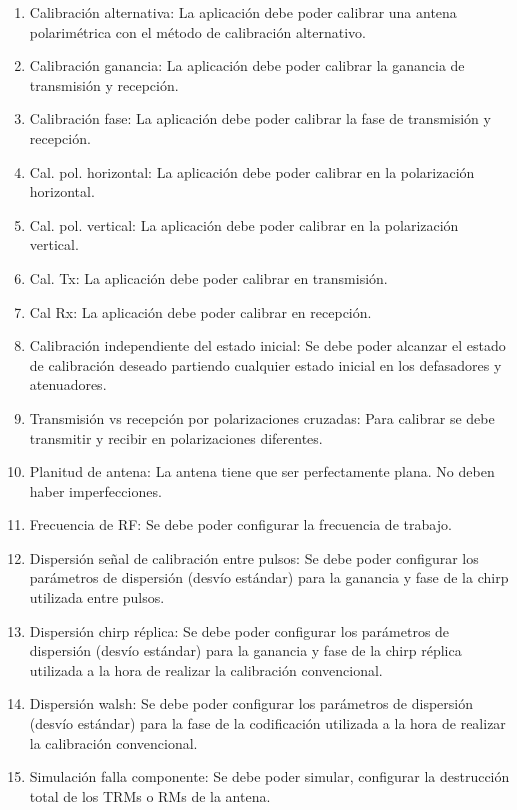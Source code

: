 \begin{enumerate}
    \item Calibración alternativa: La aplicación debe poder calibrar una antena polarimétrica con el método de calibración alternativo.

    \item Calibración ganancia: La aplicación debe poder calibrar la ganancia de transmisión y recepción.

    \item Calibración fase: La aplicación debe poder calibrar la fase de transmisión y recepción.

    \item Cal. pol. horizontal: La aplicación debe poder calibrar en la polarización horizontal.
    \item Cal. pol. vertical: La aplicación debe poder calibrar en la polarización vertical.
    \item Cal. Tx: La aplicación debe poder calibrar en transmisión.
    \item Cal Rx: La aplicación debe poder calibrar en recepción.

    \item Calibración independiente del estado inicial: Se debe poder alcanzar el estado de calibración deseado partiendo
		cualquier estado inicial en los defasadores y atenuadores.

    \item Transmisión vs recepción por polarizaciones cruzadas: Para calibrar se debe transmitir y recibir en polarizaciones
		diferentes.

    \item Planitud de antena: La antena tiene que ser perfectamente plana. No deben haber imperfecciones.

    \item Frecuencia de RF: Se debe poder configurar la frecuencia de trabajo.

    \item Dispersión señal de calibración entre pulsos: Se debe poder configurar los parámetros de dispersión (desvío estándar) para
		la ganancia y fase de la chirp utilizada entre pulsos.

    \item Dispersión chirp réplica: Se debe poder configurar los parámetros de dispersión (desvío estándar) para la
		ganancia y fase de la chirp réplica utilizada a la hora de realizar la calibración convencional.

    \item Dispersión walsh: Se debe poder configurar los parámetros de dispersión (desvío estándar) para la fase de la
		codificación utilizada a la hora de realizar la calibración convencional.

    \item Simulación falla componente: Se debe poder simular, configurar la destrucción total de los TRMs o RMs de la antena.
\end{enumerate}


